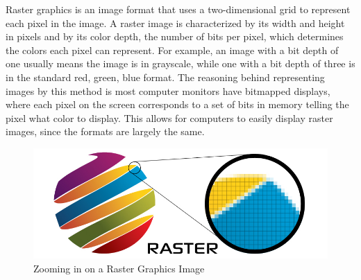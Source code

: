 \documentclass[12pt]{report}
\begin{document}
Raster graphics is an image format that uses a two-dimensional grid to represent each pixel in the image. 
A raster image is characterized by its width and height in pixels and by its color depth, the number of bits per pixel, which determines the colors each pixel can represent. 
For example, an image with a bit depth of one usually means the image is in grayscale, while one with a bit depth of three is in the standard red, green, blue format. 
The reasoning behind representing images by this method is most computer monitors have bitmapped displays, where each pixel on the screen corresponds to a set of bits in memory telling the pixel what color to display. 
This allows for computers to easily display raster images, since the formats are largely the same.
\begin{figure}
\includegraphics[width=\textwidth]{raster.jpg}
\caption{Zooming in on a Raster Graphics Image}
\end{figure}
\end{document}

